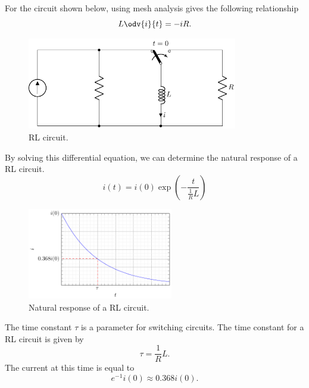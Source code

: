 \documentclass{article}
\begin{document}
\begin{definition}
    For the circuit shown below, using mesh analysis gives the following relationship
    \begin{equation*}
        L \odv{i}{t} = -iR.
    \end{equation*}
    \begin{figure}[H]
        \centering
        \includegraphics[height = 4cm, keepaspectratio = true]{figures/rl_natural.pdf}
        \caption{RL circuit.}
    \end{figure}
    By solving this differential equation, we can determine the natural response of a
    RL circuit.
    \begin{equation*}
        i(t) = i(0)\exp{\left( -\frac{t}{\frac{1}{R}L} \right)}
    \end{equation*}
    \begin{figure}[H]
        \centering
        \includegraphics[height = 4cm, keepaspectratio = true]{figures/rl_natural_plot.pdf}
        \caption{Natural response of a RL circuit.}
    \end{figure}
\end{definition}
\begin{definition}
    The time constant \(\tau\) is a parameter for switching circuits. The time constant for a RL circuit is given by
    \begin{equation*}
        \tau = \frac{1}{R}L.
    \end{equation*}
    The current at this time is equal to
    \begin{equation*}
        e^{-1}i(0) \approx 0.368i(0).
    \end{equation*}
\end{definition}
\end{document}
